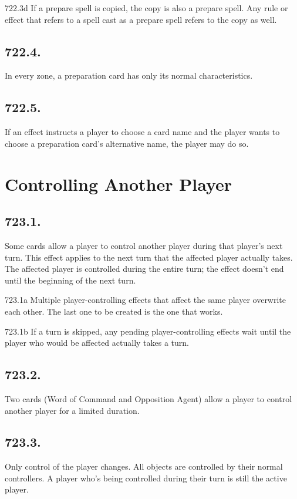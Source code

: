 722.3d If a prepare spell is copied, the copy is also a prepare spell. Any rule or effect that refers to a spell cast as a prepare spell refers to the copy as well.

\subsection*{722.4.}
In every zone, a preparation card has only its normal characteristics.

\subsection*{722.5.}
If an effect instructs a player to choose a card name and the player wants to choose a preparation card’s alternative name, the player may do so.

\section{Controlling Another Player}
\subsection*{723.1.}
Some cards allow a player to control another player during that player’s next turn. This effect applies to the next turn that the affected player actually takes. The affected player is controlled during the entire turn; the effect doesn’t end until the beginning of the next turn.

723.1a Multiple player-controlling effects that affect the same player overwrite each other. The last one to be created is the one that works.

723.1b If a turn is skipped, any pending player-controlling effects wait until the player who would be affected actually takes a turn.

\subsection*{723.2.}
Two cards (Word of Command and Opposition Agent) allow a player to control another player for a limited duration.

\subsection*{723.3.}
Only control of the player changes. All objects are controlled by their normal controllers. A player who’s being controlled during their turn is still the active player.

